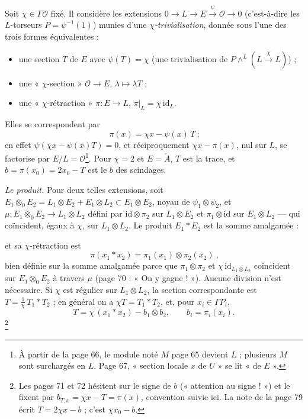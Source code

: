 \documentclass[11pt,a4paper]{article}
\begin{document}
Soit $\chi \in \Gamma\mathcal{O}$ fixé. Il considère les extensions
$0 \to L \to E \xrightarrow{\psi} \mathcal{O} \to 0$ (c'est-à-dire les $L$-torseurs
$P = \psi^{-1}(1)$) munies d'une \emph{$\chi$-trivialisation}, donnée sous l'une des
trois formes équivalentes :
\begin{itemize}
\item une section $T$ de $E$ avec $\psi(T) = \chi$ (une trivialisation de
$P \wedge^{L}(L \xrightarrow{\chi} L)$) ;
\item une « $\chi$-section » $\mathcal{O} \to E$, $\lambda \mapsto \lambda T$ ;
\item une « $\chi$-rétraction » $\pi : E \to L$, $\pi|_L = \chi\,\mathrm{id}_L$.
\end{itemize}
Elles se correspondent par
\[
  \boxed{\ \pi(x) = \chi x - \psi(x)\,T\ } ;
\]
en effet $\psi(\chi x - \psi(x)T) = 0$, et réciproquement $\chi x - \pi(x)$, nul sur $L$,
se factorise par $E/L = \mathcal{O}$\footnote{À partir de la page 66, le module noté
$M$ page 65 devient $L$ ; plusieurs $M$ sont surchargés en $L$. Page 67, « section
locale $x$ de $U$ » se lit « de $E$ ».}. Pour $\chi = 2$ et $E = \check{A}$, $T$ est la
trace, et $b = \pi(x_0) = 2x_0 - T$ est le $b$ des scindages.

\emph{Le produit.} Pour deux telles extensions, soit $E_1 \otimes_0 E_2 = L_1 \otimes E_2 +
E_1 \otimes L_2 \subset E_1 \otimes E_2$, noyau de $\psi_1 \otimes \psi_2$, et
$\mu : E_1 \otimes_0 E_2 \to L_1 \otimes L_2$ défini par $\mathrm{id} \otimes \pi_2$ sur
$L_1 \otimes E_2$ et $\pi_1 \otimes \mathrm{id}$ sur $E_1 \otimes L_2$ --- qui coïncident,
égaux à $\chi$, sur $L_1 \otimes L_2$. Le produit $E_1 * E_2$ est la somme amalgamée :


et sa $\chi$-rétraction est
\[
  \boxed{\ \pi(x_1 * x_2) = \pi_1(x_1) \otimes \pi_2(x_2)\ } ,
\]
bien définie sur la somme amalgamée parce que $\pi_1 \otimes \pi_2$ et
$\chi\,\mathrm{id}_{L_1 \otimes L_2}$ coïncident sur $E_1 \otimes_0 E_2$ à travers $\mu$
(page 70 : « On y gagne ! »). Aucune division n'est nécessaire. Si $\chi$ est
régulier sur $L_1 \otimes L_2$, la section correspondante est $T = \tfrac{1}{\chi}\,T_1 *
T_2$ ; en général on a $\chi T = T_1 * T_2$, et, pour $x_i \in \Gamma P_i$,
\[
  T = \chi\,(x_1 * x_2) - b_1 \otimes b_2, \qquad b_i = \pi_i(x_i).
\]\footnote{Les pages 71 et 72
  hésitent sur le signe de $b$ (« attention au signe ! ») et le fixent par
  $b_{T, x} = \chi x - T = \pi(x)$, convention suivie ici. La note de la page 79
  écrit $T = 2\chi x - b$ ; c'est $\chi x_0 - b$.}
\end{document}
